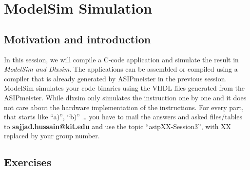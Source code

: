 \hypertarget{synthesis-and-hardware-implementation}{%
\chapter*{ModelSim Simulation}\label{synthesis-and-hardware-implementation}}


\section*{Motivation and introduction}

In this session, we will compile a C-code application and simulate the
result in \emph{ModelSim and Dlxsim}. The applications can be assembled
or compiled using a compiler that is already generated by ASIPmeister in
the previous session. ModelSim simulates your code binaries using the
VHDL files generated from the ASIPmeister. While dlxsim only simulates
the instruction one by one and it does not care about the hardware
implementation of the instructions. For every part, that starts like
``a)'', ``b)'' \ldots{} you have to mail the answers and asked
files/tables to \textbf{sajjad.hussain@kit.edu} and use the topic
``asipXX-Session3'', with XX replaced by your group number.

\section*{Exercises}


